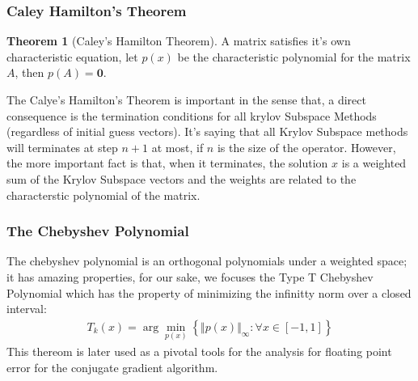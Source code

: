 \documentclass[]{article}
\theoremstyle{definition}
\newtheorem{theorem}{Theorem}  %
\begin{document}
        \subsubsection{Caley Hamilton's Theorem}
            \begin{theorem}[Caley's Hamilton Theorem]\label{theorem:Caley_Hamilton}
                A matrix satisfies it's own characteristic equation, let $p(x)$ be the characteristic polynomial for the matrix $A$, then $p(A) = \mathbf 0$. 
            \end{theorem}
            The Calye's Hamilton's Theorem is important in the sense that, a direct consequence is the termination conditions for all krylov Subspace Methods (regardless of initial guess vectors). It's saying that all Krylov Subspace methods will terminates at step $n + 1$ at most, if $n$ is the size of the operator. However, the more important fact is that, when it terminates, the solution $x$ is a weighted sum of the Krylov Subspace vectors and the weights are related to the characterstic polynomial of the matrix. 
        \subsubsection{The Chebyshev Polynomial}
            The chebyshev polynomial is an orthogonal polynomials under a weighted space; it has amazing properties, for our sake, we focuses the Type T Chebyshev Polynomial which has the property of minimizing the infinitty norm over a closed interval: 
            \begin{align}
                T_k(x) = \arg\min_{p(x)}
                \left\lbrace
                    \Vert p(x) \Vert_\infty: \forall x \in [-1, 1]
                \right\rbrace
            \end{align}
            This thereom is later used as a pivotal tools for the analysis for floating point error for the conjugate gradient algorithm. 
\end{document}
